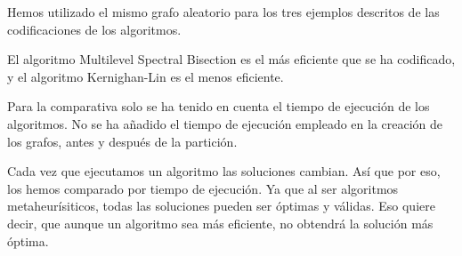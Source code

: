 Hemos utilizado el mismo grafo aleatorio para los tres ejemplos descritos de las codificaciones de los algoritmos.

El algoritmo Multilevel Spectral Bisection es el más eficiente que se ha codificado, y el algoritmo Kernighan-Lin es el menos eficiente.

Para la comparativa solo se ha tenido en cuenta el tiempo de ejecución de los algoritmos. No se ha añadido el tiempo de ejecución empleado en la creación de los grafos, antes y después de la partición.

Cada vez que ejecutamos un algoritmo las soluciones cambian. Así que por eso, los hemos comparado por tiempo de ejecución. Ya que al ser algoritmos metaheurísiticos, todas las soluciones pueden ser óptimas y válidas. Eso quiere decir, que aunque un algoritmo sea más eficiente, no obtendrá la solución más óptima.